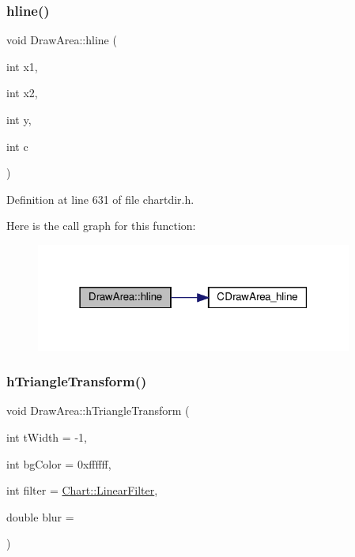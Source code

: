 \subsubsection{\texorpdfstring{hline()}{hline()}}
{\footnotesize\ttfamily void Draw\+Area\+::hline (\begin{DoxyParamCaption}\item[{int}]{x1,  }\item[{int}]{x2,  }\item[{int}]{y,  }\item[{int}]{c }\end{DoxyParamCaption})\hspace{0.3cm}{\ttfamily [inline]}}



Definition at line 631 of file chartdir.\+h.

Here is the call graph for this function\+:
\nopagebreak
\begin{figure}[H]
\begin{center}
\leavevmode
\includegraphics[width=295pt]{class_draw_area_a77f8b8d3591e48dabfa4adca9e534d57_cgraph}
\end{center}
\end{figure}
\mbox{\label{class_draw_area_a24e00fc723cbe7b64fad7c51e4c10577}} 
\subsubsection{\texorpdfstring{h\+Triangle\+Transform()}{hTriangleTransform()}}
{\footnotesize\ttfamily void Draw\+Area\+::h\+Triangle\+Transform (\begin{DoxyParamCaption}\item[{int}]{t\+Width = {\ttfamily -\/1},  }\item[{int}]{bg\+Color = {\ttfamily 0xffffff},  }\item[{int}]{filter = {\ttfamily \hyperlink{namespace_chart_ab75b9aa1781d0e0159ef1d441b577764a8cd729b7a982bac2dce8b021511e3ac6}{Chart\+::\+Linear\+Filter}},  }\item[{double}]{blur = {} }\end{DoxyParamCaption})\hspace{0.3cm}{\ttfamily [inline]}}



